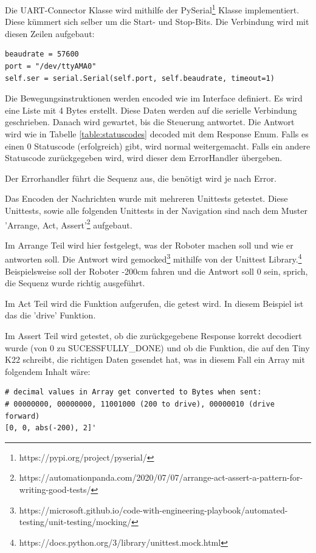 Die UART-Connector Klasse  wird mithilfe der PySerial\footnote{https://pypi.org/project/pyserial/} Klasse implementiert. Diese kümmert sich selber um die Start- und Stop-Bits.
Die Verbindung wird mit diesen Zeilen aufgebaut:
\begin{verbatim}
beaudrate = 57600
port = "/dev/ttyAMA0"
self.ser = serial.Serial(self.port, self.beaudrate, timeout=1)
\end{verbatim}

Die Bewegungsinstruktionen werden encoded wie im Interface definiert. Es wird eine Liste mit 4 Bytes erstellt.
Diese Daten werden auf die serielle Verbindung geschrieben.
Danach wird gewartet, bis die Steuerung antwortet. Die Antwort wird wie in Tabelle \ref{table:statuscodes} decoded mit dem Response Enum.
Falls es einen 0 Statuscode (erfolgreich) gibt, wird normal weitergemacht. Falls ein andere Statuscode zurückgegeben wird, wird dieser dem ErrorHandler übergeben.

Der Errorhandler führt die Sequenz aus, die benötigt wird je nach Error.

Das Encoden der Nachrichten wurde mit mehreren Unittests getestet. Diese Unittests, sowie alle folgenden Unittests in der Navigation sind nach dem Muster 'Arrange, Act, Assert'\footnote{https://automationpanda.com/2020/07/07/arrange-act-assert-a-pattern-for-writing-good-tests/} aufgebaut.

Im Arrange Teil wird hier festgelegt, was der Roboter machen soll und wie er antworten soll. Die Antwort wird gemocked\footnote{https://microsoft.github.io/code-with-engineering-playbook/automated-testing/unit-testing/mocking/} mithilfe von der Unittest Library.\footnote{https://docs.python.org/3/library/unittest.mock.html} Beispielsweise soll der Roboter -200cm fahren und die Antwort soll 0 sein, sprich, die Sequenz wurde richtig ausgeführt.

Im Act Teil wird die Funktion aufgerufen, die getest wird. In diesem Beispiel ist das die 'drive' Funktion.

Im Assert Teil wird getestet, ob die zurückgegebene Response korrekt decodiert wurde (von 0 zu SUCESSFULLY\_DONE) und ob die Funktion, die auf den Tiny K22 schreibt, die richtigen Daten gesendet hat, was in diesem Fall ein Array mit folgendem Inhalt wäre:

\begin{verbatim}
# decimal values in Array get converted to Bytes when sent:
# 00000000, 00000000, 11001000 (200 to drive), 00000010 (drive forward)
[0, 0, abs(-200), 2]'
\end{verbatim}

